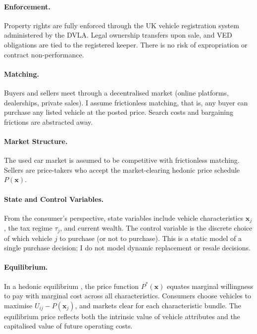 \documentclass[12pt, a4paper]{article}
\begin{document}
\paragraph{Enforcement.}
Property rights are fully enforced through the UK vehicle registration system administered by the DVLA. Legal ownership transfers upon sale, and VED obligations are tied to the registered keeper. There is no risk of expropriation or contract non-performance.

\paragraph{Matching.}
Buyers and sellers meet through a decentralised market (online platforms, dealerships, private sales). I assume frictionless matching, that is, any buyer can purchase any listed vehicle at the posted price. Search costs and bargaining frictions are abstracted away.

\paragraph{Market Structure.}
The used car market is assumed to be competitive with frictionless matching. Sellers are price-takers who accept the market-clearing hedonic price schedule $P(\mathbf{x})$.

\paragraph{State and Control Variables.}
From the consumer's perspective, state variables include vehicle characteristics $\mathbf{x}_j$, the tax regime $\tau_j$, and current wealth. The control variable is the discrete choice of which vehicle $j$ to purchase (or not to purchase). This is a static model of a single purchase decision; I do not model dynamic replacement or resale decisions.

\paragraph{Equilibrium.}
In a hedonic equilibrium \cite{rosen1974,bajari2005}, the price function $P^*(\mathbf{x})$ equates marginal willingness to pay with marginal cost across all characteristics. Consumers choose vehicles to maximise $U_{ij} - P(\mathbf{x}_j)$, and markets clear for each characteristic bundle. The equilibrium price reflects both the intrinsic value of vehicle attributes and the capitalised value of future operating costs.
\end{document}

